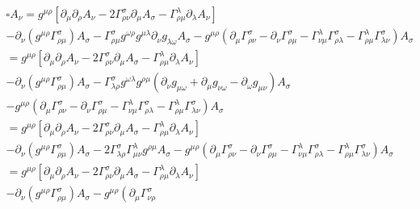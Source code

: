 \documentclass[12pt]{article}
\def\nn{\nonumber}
\begin{document}
\begin{gather}
\square
A_{\nu}
=
g^{\mu \rho}
\left[
\partial_{\mu}
\partial_{\rho}
A_{\nu}
-
2 \Gamma^{\sigma}_{\rho\nu}
\partial_{\mu}
A_{\sigma}
-
\Gamma^{\lambda}_{\rho \mu}
\partial_{\lambda}
A_{\nu}
\right]
\nn \\
-
\partial_{\nu}
(g^{\mu \rho}
\Gamma^{\sigma}_{\rho\mu})
A_{\sigma}
-
\Gamma^{\sigma}_{\rho\mu}
g^{\omega \rho}
g^{\mu \lambda}
\partial_{\nu}
g_{\lambda \omega}
A_{\sigma}
-
g^{\mu \rho}
\left(
\partial_{\mu}
\Gamma^{\sigma}_{\rho\nu}
-
\partial_{\nu}
\Gamma^{\sigma}_{\rho\mu}
-
\Gamma^{\lambda}_{\nu \mu}
\Gamma^{\sigma}_{\rho\lambda}
-
\Gamma^{\lambda}_{\rho \mu}
\Gamma^{\sigma}_{\lambda\nu}
\right)
A_{\sigma}
\nn \\
=
g^{\mu \rho}
\left[
\partial_{\mu}
\partial_{\rho}
A_{\nu}
-
2 \Gamma^{\sigma}_{\rho\nu}
\partial_{\mu}
A_{\sigma}
-
\Gamma^{\lambda}_{\rho \mu}
\partial_{\lambda}
A_{\nu}
\right]
\nn \\
-
\partial_{\nu}
(g^{\mu \rho}
\Gamma^{\sigma}_{\rho\mu})
A_{\sigma}
-
\Gamma^{\sigma}_{\lambda \rho}
g^{\omega \lambda}
g^{\rho\mu}
\left(
\partial_{\nu}
g_{\mu \omega}
+
\partial_{\mu}
g_{\nu \omega}
-
\partial_{\omega}
g_{\mu \nu}
\right)
A_{\sigma}
\nn \\
-
g^{\mu \rho}
\left(
\partial_{\mu}
\Gamma^{\sigma}_{\rho\nu}
-
\partial_{\nu}
\Gamma^{\sigma}_{\rho\mu}
-
\Gamma^{\lambda}_{\nu \mu}
\Gamma^{\sigma}_{\rho\lambda}
-
\Gamma^{\lambda}_{\rho \mu}
\Gamma^{\sigma}_{\lambda\nu}
\right)
A_{\sigma}
\nn \\
=
g^{\mu \rho}
\left[
\partial_{\mu}
\partial_{\rho}
A_{\nu}
-
2 \Gamma^{\sigma}_{\rho\nu}
\partial_{\mu}
A_{\sigma}
-
\Gamma^{\lambda}_{\rho \mu}
\partial_{\lambda}
A_{\nu}
\right]
\nn \\
-
\partial_{\nu}
(g^{\mu \rho}
\Gamma^{\sigma}_{\rho\mu})
A_{\sigma}
-
2 \Gamma^{\sigma}_{\lambda \rho}
\Gamma^{\lambda}_{\mu\nu}
g^{\rho\mu}
A_{\sigma}
-
g^{\mu \rho}
\left(
\partial_{\mu}
\Gamma^{\sigma}_{\rho\nu}
-
\partial_{\nu}
\Gamma^{\sigma}_{\rho\mu}
-
\Gamma^{\lambda}_{\nu \mu}
\Gamma^{\sigma}_{\rho\lambda}
-
\Gamma^{\lambda}_{\rho \mu}
\Gamma^{\sigma}_{\lambda\nu}
\right)
A_{\sigma}
\nn \\
=
g^{\mu \rho}
\left[
\partial_{\mu}
\partial_{\rho}
A_{\nu}
-
2 \Gamma^{\sigma}_{\rho\nu}
\partial_{\mu}
A_{\sigma}
-
\Gamma^{\lambda}_{\rho \mu}
\partial_{\lambda}
A_{\nu}
\right]
\nn \\
-
\partial_{\nu}
(g^{\mu \rho}
\Gamma^{\sigma}_{\rho\mu})
A_{\sigma}
-
g^{\mu \rho}
\left(
\partial_{\mu}
\Gamma^{\sigma}_{\nu\rho}

\end{gather}
\end{document}
